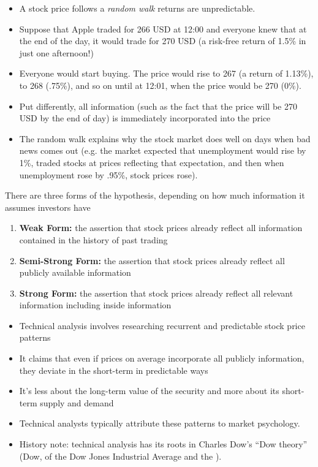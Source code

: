 \documentclass{beamer}
\begin{document}
\begin{frame}{}
	\begin{itemize}
		\item A stock price follows a \textit{random walk} returns are unpredictable.
		\item Suppose that Apple traded for 266 USD at 12:00 and everyone knew that at the end of the day, it would trade for 270 USD (a risk-free return of 1.5\% in just one afternoon!)
		\item Everyone would start buying. The price would rise to 267 (a return of 1.13\%), to 268 (.75\%), and so on until at 12:01, when the price would be 270 (0\%). 
		\item Put differently, all information (such as the fact that the price will be 270 USD by the end of day) is immediately incorporated into the price
		\item The random walk explains why the stock market does well on days when bad news comes out (e.g. the market expected that unemployment would rise by 1\%, traded stocks at prices reflecting that expectation, and then when unemployment rose by .95\%, stock prices rose).
	\end{itemize}
\end{frame}

\begin{frame}{}
	There are three forms of the hypothesis, depending on how much information it assumes investors have
	\begin{enumerate}
		\item\textbf{Weak Form:} the assertion that stock prices already reflect all information contained in the history of past trading
		\item\textbf{Semi-Strong Form:} the assertion that stock prices already reflect all publicly available information 
		\item\textbf{Strong Form:} the assertion that stock prices already reflect all relevant information including inside information
	\end{enumerate}
\end{frame}

\begin{frame}{}
	\begin{itemize}
		\item Technical analysis involves researching recurrent and predictable stock price patterns
		\item It claims that even if prices on average incorporate all publicly information, they deviate in the short-term in predictable ways
		\item It's less about the long-term value of the security and more about its short-term supply and demand
		\item Technical analysts typically attribute these patterns to market psychology. 
		\item History note: technical analysis has its roots in Charles Dow's ``Dow theory'' (Dow, of the Dow Jones Industrial Average and the ).
	\end{itemize}
\end{frame}
\end{document}
